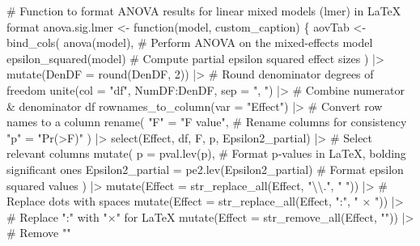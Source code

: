 \documentclass[
  bookmarksnumbered]{article}
\newenvironment{Shaded}{\begin{snugshade}}{\end{snugshade}}
\newcommand{\AttributeTok}[1]{\textcolor[rgb]{0.80,0.80,0.80}{#1}}
\newcommand{\CommentTok}[1]{\textcolor[rgb]{0.50,0.62,0.50}{#1}}
\newcommand{\ControlFlowTok}[1]{\textcolor[rgb]{0.94,0.87,0.69}{#1}}
\newcommand{\DecValTok}[1]{\textcolor[rgb]{0.86,0.86,0.80}{#1}}
\newcommand{\FunctionTok}[1]{\textcolor[rgb]{0.94,0.94,0.56}{#1}}
\newcommand{\NormalTok}[1]{\textcolor[rgb]{0.80,0.80,0.80}{#1}}
\newcommand{\OtherTok}[1]{\textcolor[rgb]{0.94,0.94,0.56}{#1}}
\newcommand{\SpecialCharTok}[1]{\textcolor[rgb]{0.86,0.64,0.64}{#1}}
\newcommand{\StringTok}[1]{\textcolor[rgb]{0.80,0.58,0.58}{#1}}
\begin{document}
\begin{Shaded}
\begin{Highlighting}[]
\CommentTok{\# Function to format ANOVA results for linear mixed models (lmer) in LaTeX format}
\NormalTok{anova.sig.lmer }\OtherTok{\textless{}{-}} \ControlFlowTok{function}\NormalTok{(model, custom\_caption) \{}
\NormalTok{  aovTab }\OtherTok{\textless{}{-}} \FunctionTok{bind\_cols}\NormalTok{(}
    \FunctionTok{anova}\NormalTok{(model), }\CommentTok{\# Perform ANOVA on the mixed{-}effects model}
    \FunctionTok{epsilon\_squared}\NormalTok{(model) }\CommentTok{\# Compute partial epsilon squared effect sizes}
\NormalTok{  ) }\SpecialCharTok{|\textgreater{}}
    \FunctionTok{mutate}\NormalTok{(}\AttributeTok{DenDF =} \FunctionTok{round}\NormalTok{(DenDF, }\DecValTok{2}\NormalTok{)) }\SpecialCharTok{|\textgreater{}} \CommentTok{\# Round denominator degrees of freedom}
    \FunctionTok{unite}\NormalTok{(}\AttributeTok{col =} \StringTok{"df"}\NormalTok{, NumDF}\SpecialCharTok{:}\NormalTok{DenDF, }\AttributeTok{sep =} \StringTok{", "}\NormalTok{) }\SpecialCharTok{|\textgreater{}} \CommentTok{\# Combine numerator \& denominator df}
    \FunctionTok{rownames\_to\_column}\NormalTok{(}\AttributeTok{var =} \StringTok{"Effect"}\NormalTok{) }\SpecialCharTok{|\textgreater{}} \CommentTok{\# Convert row names to a column}
    \FunctionTok{rename}\NormalTok{(}
      \StringTok{"F"} \OtherTok{=} \StringTok{"F value"}\NormalTok{, }\CommentTok{\# Rename columns for consistency}
      \StringTok{"p"} \OtherTok{=} \StringTok{"Pr(\textgreater{}F)"}
\NormalTok{    ) }\SpecialCharTok{|\textgreater{}}
    \FunctionTok{select}\NormalTok{(Effect, df, F, p, Epsilon2\_partial) }\SpecialCharTok{|\textgreater{}} \CommentTok{\# Select relevant columns}
    \FunctionTok{mutate}\NormalTok{(}
      \AttributeTok{p =} \FunctionTok{pval.lev}\NormalTok{(p), }\CommentTok{\# Format p{-}values in LaTeX, bolding significant ones}
      \AttributeTok{Epsilon2\_partial =} \FunctionTok{pe2.lev}\NormalTok{(Epsilon2\_partial) }\CommentTok{\# Format epsilon squared values}
\NormalTok{    ) }\SpecialCharTok{|\textgreater{}}
    \FunctionTok{mutate}\NormalTok{(}\AttributeTok{Effect =} \FunctionTok{str\_replace\_all}\NormalTok{(Effect, }\StringTok{"}\SpecialCharTok{\textbackslash{}\textbackslash{}}\StringTok{."}\NormalTok{, }\StringTok{" "}\NormalTok{)) }\SpecialCharTok{|\textgreater{}} \CommentTok{\# Replace dots with spaces}
    \FunctionTok{mutate}\NormalTok{(}\AttributeTok{Effect =} \FunctionTok{str\_replace\_all}\NormalTok{(Effect, }\StringTok{":"}\NormalTok{, }\StringTok{" × "}\NormalTok{)) }\SpecialCharTok{|\textgreater{}} \CommentTok{\# Replace ":" with "×" for LaTeX}
    \FunctionTok{mutate}\NormalTok{(}\AttributeTok{Effect =} \FunctionTok{str\_remove\_all}\NormalTok{(Effect, }\StringTok{"\textasciigrave{}"}\NormalTok{)) }\SpecialCharTok{|\textgreater{}} \CommentTok{\# Remove "\textasciigrave{}"}

\end{Highlighting}
\end{Shaded}
\end{document}
